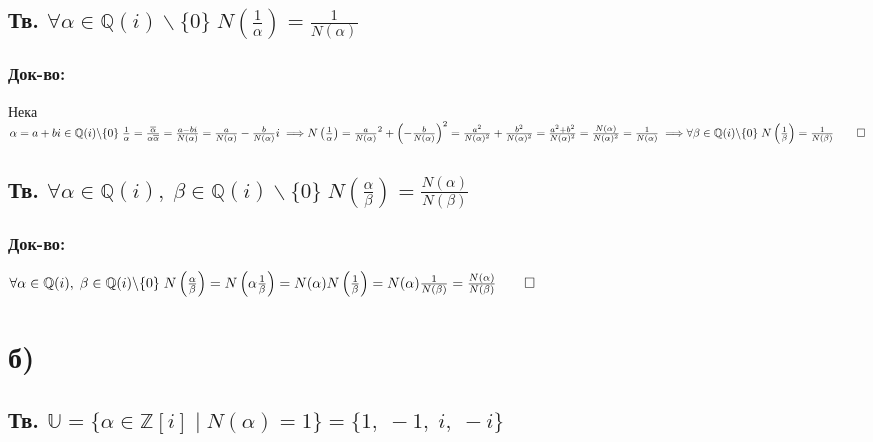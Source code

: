 \documentclass[12pt]{article}
\newcommand{\Z}{\mathbb{Z}}
\newcommand{\Q}{\mathbb{Q}}
\newcommand{\Rev}{\mathbb{U}}
\begin{document}
    \subsection*{Тв. \(\forall \alpha \in \Q(i)\backslash\{0\} \; N\left(\frac{1}{\alpha}\right) = \frac{1}{N(\alpha)} \)}
    \subsubsection*{Док-во:}
    Нека \(\alpha = a + bi \in \Q(i)\backslash\{0\} \;  \frac{1}{\alpha} = \frac{\overline{\alpha}}{\alpha\overline{\alpha}} = \frac{a - bi}{N(\alpha)} = \frac{a}{N(\alpha)} - \frac{b}{N(\alpha)}i \implies \\\\
    N\left(\frac{1}{\alpha}\right) = \frac{a}{N(\alpha)}^2 + \left(- \frac{b}{N(\alpha)}\right)^2 = \frac{a^2}{N(\alpha)^2} + \frac{b^2}{N(\alpha)^2}
    = \frac{a^2 + b^2}{N(\alpha)^2} = \frac{N(\alpha)}{N(\alpha)^2} = \frac{1}{N(\alpha)} \implies \\\\
    \forall \beta \in \Q(i)\backslash\{0\} \; N\left(\frac{1}{\beta}\right) = \frac{1}{N(\beta)} \qed \)
    \subsection*{Тв. \(\forall \alpha \in \Q(i), \; \beta \in \Q(i)\backslash\{0\} \; N\left(\frac{\alpha}{\beta}\right) = \frac{N(\alpha)}{N(\beta)} \)}
    \subsubsection*{Док-во:}
    \(\forall \alpha \in \Q(i), \; \beta \in \Q(i)\backslash\{0\} \; N\left(\frac{\alpha}{\beta}\right) = N\left(\alpha\frac{1}{\beta}\right) =
    N(\alpha)N\left(\frac{1}{\beta}\right) = N(\alpha)\frac{1}{N(\beta)} = \frac{N(\alpha)}{N(\beta)} \qed \)
    \section*{б)}
    \subsection*{Тв. \(\Rev = \{\alpha \in \Z[i] \; | \; N(\alpha) = 1 \} = \{1, \; -1, \; i, \; -i\}\)}
\end{document}
